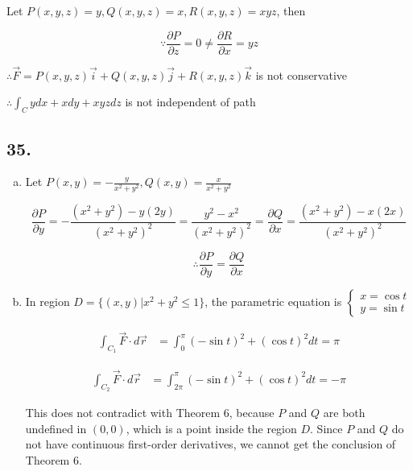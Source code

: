 \documentclass{article}
\begin{document}
  Let $P(x, y, z) = y, Q(x, y, z) = x, R(x, y, z) = xyz$, then

  $$\because \frac{\partial P}{\partial z} = 0 \not =  \frac{\partial R}{\partial x} = yz$$

  $\therefore \overrightarrow{F} = P(x, y, z)\overrightarrow{i} + Q(x, y, z)\overrightarrow{j} + R(x, y, z)\overrightarrow{k}$ is not conservative

  $\therefore \int_C ydx + xdy + xyzdz$ is not independent of path

  \subsection*{35. }

  \begin{enumerate}[(a)]
    \item 
    Let $P(x, y) = -\frac{y}{x^2+y^2}, Q(x, y) = \frac{x}{x^2+y^2}$

    $$\frac{\partial P}{\partial y} = -\frac{(x^2+y^2) - y(2y)}{(x^2+y^2)^2} = \frac{y^2-x^2}{(x^2+y^2)^2} = \frac{\partial Q}{\partial x} = \frac{(x^2+y^2) - x(2x)}{(x^2+y^2)^2}$$

    $$\therefore \frac{\partial P}{\partial y} = \frac{\partial Q}{\partial x}$$

    \item

    In region $D = \{ (x, y) | x^2 + y^2 \leq 1\}$, the parametric equation is $\left\{ \begin{array}{ll}
      x = \cos t \\ y = \sin t
    \end{array}\right.$

    $$\begin{aligned}
      \int_{C_1} \overrightarrow{F} \cdot d\overrightarrow{r} &= \int_0^{\pi} (-\sin t)^2 + (\cos t)^2 dt = \pi
    \end{aligned}$$

    $$\begin{aligned}
      \int_{C_2} \overrightarrow{F} \cdot d\overrightarrow{r} &= \int_{2\pi}^{\pi} (-\sin t)^2 + (\cos t)^2 dt = -\pi
    \end{aligned}$$

    This does not contradict with Theorem 6, because $P$ and $Q$ are both undefined in $(0,0)$, which is a point inside the region $D$. Since $P$ and $Q$ do not have continuous first-order derivatives, we cannot get the conclusion of Theorem 6.

  \end{enumerate}
  
\end{document}
